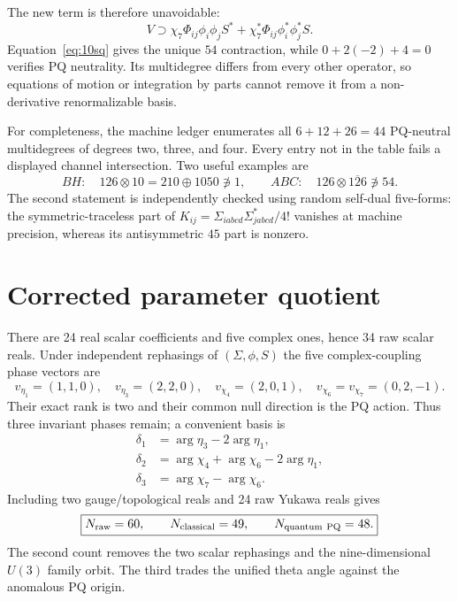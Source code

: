 \documentclass[11pt]{article}
\begin{document}
The new term is therefore unavoidable:
\begin{equation}
 \boxed{V\supset\chi_7\Phi_{ij}\phi_i\phi_jS^*
 +\chi_7^*\Phi_{ij}\phi_i^*\phi_j^*S.}
 \label{eq:chi7}
\end{equation}
Equation~\eqref{eq:10sq} gives the unique $54$ contraction, while
$0+2(-2)+4=0$ verifies PQ neutrality.  Its multidegree differs from every
other operator, so equations of motion or integration by parts cannot remove
it from a non-derivative renormalizable basis.

For completeness, the machine ledger enumerates all $6+12+26=44$
PQ-neutral multidegrees of degrees two, three, and four.  Every entry not in
the table fails a displayed channel intersection.  Two useful examples are
\begin{equation}
 BH:\quad126\otimes10=210\oplus1050\not\ni1,
 \qquad
 ABC:\quad126\otimes\overline{126}\not\ni54.
\end{equation}
The second statement is independently checked using random self-dual
five-forms: the symmetric-traceless part of
$K_{ij}=\Sigma_{iabcd}\Sigma^*_{jabcd}/4!$ vanishes at machine precision,
whereas its antisymmetric $45$ part is nonzero.

\section{Corrected parameter quotient}

There are 24 real scalar coefficients and five complex ones, hence 34 raw
scalar reals.  Under independent rephasings of $(\Sigma,\phi,S)$ the five
complex-coupling phase vectors are
\begin{equation}
 v_{\eta_1}=(1,1,0),\quad v_{\eta_3}=(2,2,0),\quad
 v_{\chi_4}=(2,0,1),\quad
 v_{\chi_6}=v_{\chi_7}=(0,2,-1).
\end{equation}
Their exact rank is two and their common null direction is the PQ action.
Thus three invariant phases remain; a convenient basis is
\begin{align}
 \delta_1&=\arg\eta_3-2\arg\eta_1,\nonumber\\
 \delta_2&=\arg\chi_4+\arg\chi_6-2\arg\eta_1,\nonumber\\
 \delta_3&=\arg\chi_7-\arg\chi_6.
\end{align}
Including two gauge/topological reals and 24 raw Yukawa reals gives
\begin{equation}
 \boxed{N_{\rm raw}=60,\qquad N_{\rm classical}=49,\qquad
 N_{\rm quantum\ PQ}=48.}
\end{equation}
The second count removes the two scalar rephasings and the nine-dimensional
$U(3)$ family orbit.  The third trades the unified theta angle against the
anomalous PQ origin.
\end{document}

